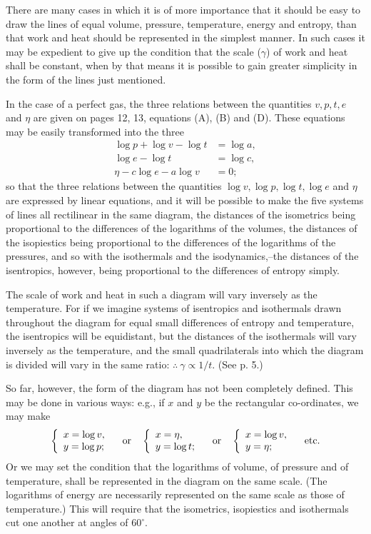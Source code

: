 \documentclass[11pt]{article}
\begin{document}
There are many cases in which it is of more importance that it should be easy to draw the lines of equal volume, pressure, temperature, energy and entropy, than that work and heat should be represented in the simplest manner. In such cases it may be expedient to give up the condition that the scale ($\gamma$) of work and heat shall be constant, when by that means it is possible to gain greater simplicity in the form of the lines just mentioned.

In the case of a perfect gas, the three relations between the quantities $v,p,t,e$ and $\eta$ are given on pages 12, 13, equations (A), (B) and (D). These equations may be easily transformed into the three
\begin{align}
\log p+\log v-\log t&=\log a, \tag{H}\\
\log e-\log t&=\log c, \tag{I}\\
\eta-c\log e-a\log v&=0; \tag{J}
\end{align}
so that the three relations between the quantities $\log v,\log p,\log t,\log e$ and $\eta$ are expressed by linear equations, and it will be possible to make the five systems of lines all rectilinear in the same diagram, the distances of the isometrics being proportional to the differences of the logarithms of the volumes, the distances of the isopiestics being proportional to the differences of the logarithms of the pressures, and so with the isothermals and the isodynamics,--the distances of the isentropics, however, being proportional to the differences of entropy simply.

The scale of work and heat in such a diagram will vary inversely as the temperature. For if we imagine systems of isentropics and isothermals drawn throughout the diagram for equal small differences of entropy and temperature, the isentropics will be equidistant, but the distances of the isothermals will vary inversely as the temperature, and the small quadrilaterals into which the diagram is divided will vary in the same ratio: $\therefore\ \gamma\propto 1/t$. (See p. 5.)

So far, however, the form of the diagram has not been completely defined. This may be done in various ways: e.g., if $x$ and $y$ be the rectangular co-ordinates, we may make
\[
\left\{\begin{array}{l}
x=\log v,\\
y=\log p;
\end{array}\right.
\quad\hbox{or}\quad
\left\{\begin{array}{l}
x=\eta,\\
y=\log t;
\end{array}\right.
\quad\hbox{or}\quad
\left\{\begin{array}{l}
x=\log v,\\
y=\eta;
\end{array}\right.
\quad \hbox{etc.}
\]
Or we may set the condition that the logarithms of volume, of pressure and of temperature, shall be represented in the diagram on the same scale. (The logarithms of energy are necessarily represented on the same scale as those of temperature.) This will require that the isometrics, isopiestics and isothermals cut one another at angles of $60^\circ$.
\end{document}
